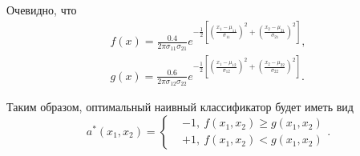 \documentclass[14pt,a4paper]{article}
\begin{document}
    Очевидно, что
    \[
    	\begin{gathered}
    		f(x) = \frac{0.4}{2\pi \sigma_{11} \sigma_{21}} e^{-\frac{1}{2} \left[ (\frac{x_1 - \mu_{11}}{\sigma_{11}})^2 + (\frac{x_2 - \mu_{21}}{\sigma_{21}})^2 \right]}, \\
    		g(x) = \frac{0.6}{2\pi \sigma_{12} \sigma_{22}} e^{-\frac{1}{2} \left[ (\frac{x_1 - \mu_{12}}{\sigma_{12}})^2 + (\frac{x_2 - \mu_{22}}{\sigma_{22}})^2 \right]}.
    	\end{gathered}
    \]
    
    Таким образом, оптимальный наивный классификатор будет иметь вид
    \[
    	a^*(x_1, x_2) = 
    	\left\{
    	\begin{aligned}
    		& -1, \ f(x_1, x_2) \geq g(x_1, x_2) \\
    		& +1, \ f(x_1, x_2) < g(x_1, x_2)
    	\end{aligned}
    	\right..
    \]
    
\end{document}
